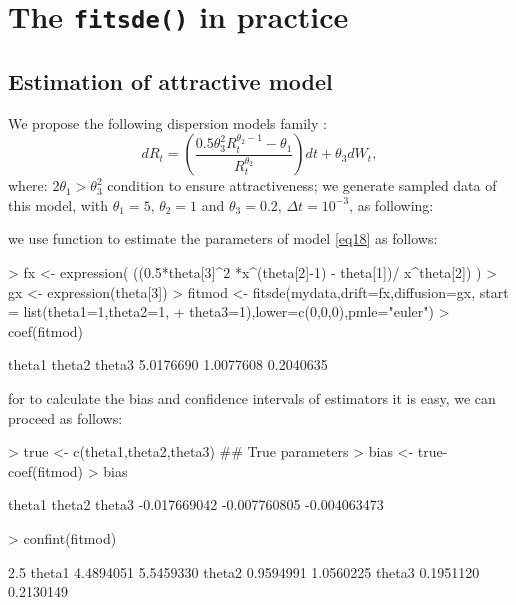 \section{The \texttt{fitsde()} in practice}

\subsection{Estimation of attractive model}

We propose the following dispersion models family \citep{Boukhetala1996}:
\begin{equation}\label{eq18}
    dR_t = \left( \frac{0.5 \theta^{2}_{3} R_t^{ \theta_{2} - 1} - \theta_{1}}{R_t^{\theta_{2}}} \right) dt + \theta_{3} dW_{t},
\end{equation}
where: $2 \theta_{1}> \theta^{2}_{3}$ condition to ensure attractiveness; we generate sampled data of this model, with
$\theta_{1}=5$, $\theta_{2}=1$ and $\theta_{3}=0.2$, $\Delta t =10^{-3}$, as following:
\begin{Schunk}
\end{Schunk}
we use  function to estimate the parameters of model \eqref{eq18} as follows:
\begin{Schunk}
\begin{Sinput}
> fx <- expression( ((0.5*theta[3]^2 *x^(theta[2]-1) - theta[1])/ x^theta[2])  )
> gx <- expression(theta[3])
> fitmod <- fitsde(mydata,drift=fx,diffusion=gx, start = list(theta1=1,theta2=1,
+                 theta3=1),lower=c(0,0,0),pmle="euler")
> coef(fitmod)
\end{Sinput}
\begin{Soutput}
   theta1    theta2    theta3
5.0176690 1.0077608 0.2040635
\end{Soutput}
\end{Schunk}
for to calculate the bias and confidence intervals of estimators it is easy, we can proceed as follows:
\begin{Schunk}
\begin{Sinput}
> true <- c(theta1,theta2,theta3)   ## True parameters
> bias <- true-coef(fitmod)
> bias
\end{Sinput}
\begin{Soutput}
      theta1       theta2       theta3
-0.017669042 -0.007760805 -0.004063473
\end{Soutput}
\begin{Sinput}
> confint(fitmod)
\end{Sinput}
\begin{Soutput}
           2.5 %
theta1 4.4894051 5.5459330
theta2 0.9594991 1.0560225
theta3 0.1951120 0.2130149
\end{Soutput}
\end{Schunk}
